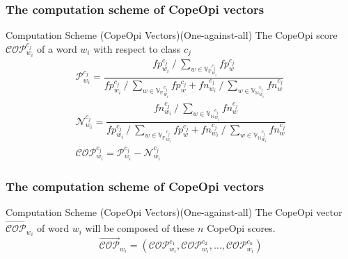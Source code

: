 \documentclass[mathserif]{beamer}
\DeclareMathOperator*{\divby}{/}
\begin{document}
\begin{frame}
\frametitle{The computation scheme of CopeOpi vectors}
\begin{block}{Computation Scheme (CopeOpi Vectors)(One-against-all)}
The CopeOpi score $\mathcal{COP}^{c_j}_{w_i}$ of a word $w_i$ with respect to class $c_j$
\begin{equation*}
\begin{gathered}
\mathcal{P}^{c_j}_{w_i} = \dfrac {
	fp^{c_j}_{w_i} \divby \sum_{w \in {\mathbb{V}_\mathbb{P}}^{c_j}_{w_i}} fp^{c_j}_w
}{
	fp^{c_j}_{w_i} \divby \sum_{w \in {\mathbb{V}_\mathbb{P}}^{c_j}_{w_i}} fp^{c_j}_w +
	fn^{c_j}_{w_i} \divby \sum_{w \in {\mathbb{V}_\mathbb{N}}^{c_j}_{w_i}} fn^{c_j}_w
}
\\
\mathcal{N}^{c_j}_{w_i} = \dfrac {
	fn^{c_j}_{w_i} \divby \sum_{w \in {\mathbb{V}_\mathbb{N}}^{c_j}_{w_i}} fn^{c_j}_w
}{
	fp^{c_j}_{w_i} \divby \sum_{w \in {\mathbb{V}_\mathbb{P}}^{c_j}_{w_i}} fp^{c_j}_w +
	fn^{c_j}_{w_i} \divby \sum_{w \in {\mathbb{V}_\mathbb{N}}^{c_j}_{w_i}} fn^{c_j}_w
}
\\
\mathcal{COP}^{c_j}_{w_i} = \mathcal{P}^{c_j}_{w_i} - \mathcal{N}^{c_j}_{w_i}
\end{gathered}
\end{equation*}
\end{block}
\begin{flushright}
\vspace{-9.5ex}
\end{flushright}
\end{frame}

\begin{frame}
\frametitle{The computation scheme of CopeOpi vectors}
\begin{block}{Computation Scheme (CopeOpi Vectors)(One-against-all)}
The CopeOpi vector $\overrightarrow{\mathcal{COP}}_{w_i}$ of word $w_i$ will be composed of these $n$ CopeOpi scores.
\begin{equation*}
\overrightarrow{\mathcal{COP}}_{w_i} = (\mathcal{COP}^{c_1}_{w_i},\mathcal{COP}^{c_2}_{w_i},\dots,\mathcal{COP}^{c_n}_{w_i})
\end{equation*}
\end{block}
\end{frame}
\end{document}

